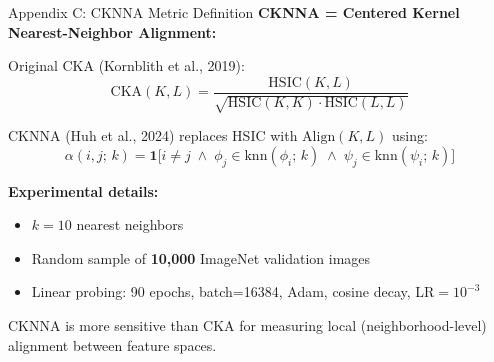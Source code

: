 \documentclass[aspectratio=169, 10pt]{beamer}
\begin{document}
\begin{frame}{Appendix C: CKNNA Metric Definition}
\small
\textbf{CKNNA = Centered Kernel Nearest-Neighbor Alignment:}

\vspace{0.4em}
Original CKA (Kornblith et al., 2019):
\[
\mathrm{CKA}(K, L) = \frac{\mathrm{HSIC}(K,L)}{\sqrt{\mathrm{HSIC}(K,K)\cdot\mathrm{HSIC}(L,L)}}
\]

CKNNA (Huh et al., 2024) replaces HSIC with $\mathrm{Align}(K,L)$ using:
\[
\alpha(i,j;\,k) = \mathbf{1}\bigl[i\neq j\;\wedge\;\phi_j\in\mathrm{knn}(\phi_i;\,k)\;\wedge\;\psi_j\in\mathrm{knn}(\psi_i;\,k)\bigr]
\]

\vspace{0.3em}
\textbf{Experimental details:}
\begin{itemize}\setlength{\itemsep}{2pt}
  \item $k = 10$ nearest neighbors
  \item Random sample of \textbf{10,000} ImageNet validation images
  \item Linear probing: 90 epochs, batch=16384, Adam, cosine decay, LR$=10^{-3}$
\end{itemize}

\vspace{0.3em}
CKNNA is more sensitive than CKA for measuring local (neighborhood-level) alignment between feature spaces.
\end{frame}
\end{document}

